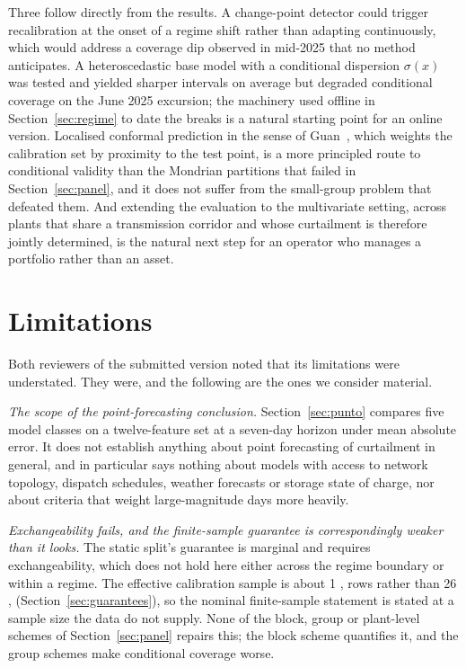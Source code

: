 \documentclass[preprint,3p,times]{elsarticle}
\providecommand{\DIFaddtex}[1]{{\protect\color{blue} \sf #1}} %
\providecommand{\DIFdeltex}[1]{{\protect\color{red} \scriptsize #1}} %
\providecommand{\DIFaddbegin}{} %
\providecommand{\DIFaddend}{} %
\providecommand{\DIFdelbegin}{} %
\providecommand{\DIFdelend}{} %
\providecommand{\DIFadd}[1]{\texorpdfstring{\DIFaddtex{#1}}{#1}} %
\providecommand{\DIFdel}[1]{\texorpdfstring{\DIFdeltex{#1}}{}} %
\begin{document}
\DIFadd{Three follow directly from the results}\DIFaddend . A change-point detector could trigger recalibration at the onset of a \DIFdelbegin \DIFdel{regime }\DIFdelend shift rather than adapting continuously, which would address \DIFdelbegin \DIFdel{a coverage dip observed in mid-2025 that no method anticipates. A heteroscedastic base model with a conditional dispersion $\sigma(x)$ was tested and yielded sharper intervals on average but degraded conditional coverage on }\DIFdelend \DIFaddbegin \DIFadd{the June 2025 excursion; the machinery used offline in Section~\ref{sec:regime} to date the breaks is a natural starting point for an online version. Localised conformal prediction in the sense of Guan~\cite{guan2022}, which weights the calibration set by proximity to the test point, is a more principled route to conditional validity than the Mondrian partitions that failed in Section~\ref{sec:panel}, and it does not suffer from the small-group problem that defeated them. And extending the evaluation to the multivariate setting, across plants that share a transmission corridor and whose curtailment is therefore jointly determined, is the natural next step for an operator who manages a portfolio rather than an asset.
}

\section{Limitations}
\label{sec:limitations}

\DIFadd{Both reviewers of the submitted version noted that its limitations were understated. They were, and the following are the ones we consider material.
}

\DIFadd{\emph{The scope of the point-forecasting conclusion.} Section~\ref{sec:punto} compares five model classes on a twelve-feature set at a seven-day horizon under mean absolute error. It does not establish anything about point forecasting of curtailment in general, and in particular says nothing about models with access to network topology, dispatch schedules, weather forecasts or storage state of charge, nor about criteria that weight large-magnitude days more heavily.
}

\DIFadd{\emph{Exchangeability fails, and the finite-sample guarantee is correspondingly weaker than it looks.} The static split's guarantee is marginal and requires exchangeability, which does not hold here either across the regime boundary or within a regime. The effective calibration sample is about 1}{\DIFadd{,}}\DIFadd{000 rows rather than 26}{\DIFadd{,}}\DIFadd{552 (Section~\ref{sec:guarantees}), so the nominal finite-sample statement is stated at a sample size the data do not supply. None of the block, group or plant-level schemes of Section~\ref{sec:panel} repairs this; the block scheme quantifies it, and the group schemes make conditional coverage worse.
}
\end{document}
